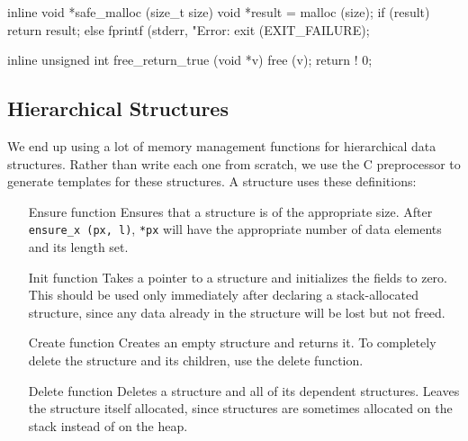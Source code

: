 \documentclass{article}
\begin{document}
\begin{ccode}
inline void *safe_malloc (size_t size) {
  void *result = malloc (size);
  if (result)
    return result;
  else {
    fprintf (stderr, "Error: %
    exit (EXIT_FAILURE);
  }
}

inline unsigned int free_return_true (void *v) {
  free (v);
  return ! 0;
}
\end{ccode}

    \subsection{Hierarchical Structures}
      \label{sec:hierarchical}

      We end up using a lot of memory management functions for hierarchical data
      structures. Rather than write each one from scratch, we use the C
      preprocessor to generate templates for these structures. A structure uses
      these definitions:

      \begin{enumerate}
        \item[Ensure function]
        Ensures that a structure is of the appropriate size. After
        \verb|ensure_x (px, l)|, \verb|*px| will have the appropriate number of
        data elements and its length set.

	\item[Init function]
	Takes a pointer to a structure and initializes the fields to zero. This
	should be used only immediately after declaring a stack-allocated
	structure, since any data already in the structure will be lost but not
	freed.

        \item[Create function]
        Creates an empty structure and returns it. To completely delete the
        structure and its children, use the delete function.

        \item[Delete function]
        Deletes a structure and all of its dependent structures. Leaves the
        structure itself allocated, since structures are sometimes allocated on
        the stack instead of on the heap.
      \end{enumerate}
\end{document}
